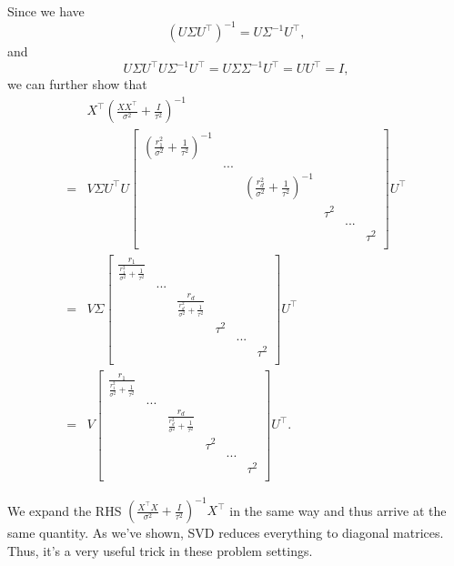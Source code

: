 Since we have 
\begin{equation*} \label{eu_eqn}
	(U \Sigma U^\top)^{-1} = U \Sigma^{-1} U^\top,
\end{equation*}
and
\begin{equation} \label{eu_eqn}
	U \Sigma U^\top U \Sigma^{-1} U^\top = U \Sigma \Sigma^{-1} U^\top = U U^\top = I,
\end{equation}
we can further show that 
\begin{align*}
		& X^\top (\frac{XX^\top}{\sigma^2} + \frac{I}{\tau^2})^{-1} \\
		= & V \Sigma U^\top U
		\begin{bmatrix}
			(\frac{r_1^2}{\sigma^2} + \frac{1}{\tau^2})^{-1} & & & & &  \\
			& ... & & & & \\
			& & (\frac{r_d^2}{\sigma^2} + \frac{1}{\tau^2})^{-1} & & &  \\
			& & & \tau^2 & & \\
			& & & & ... & \\
			& & & & & \tau^2 \\
		\end{bmatrix}
		U^\top \\
		= & V \Sigma
		\begin{bmatrix}
			\frac{r_1}{\frac{r_1^2}{\sigma^2} + \frac{1}{\tau^2}} & & & & &  \\
			& ... & & & & \\
			& & \frac{r_d}{\frac{r_d^2}{\sigma^2} + \frac{1}{\tau^2}} & & &  \\
			& & & \tau^2 & & \\
			& & & & ... & \\
			& & & & & \tau^2 \\
		\end{bmatrix}
		U^\top \\
		= & V 
		\begin{bmatrix}
			\frac{r_1}{\frac{r_1^2}{\sigma^2} + \frac{1}{\tau^2}} & & & & &  \\
			& ... & & & & \\
			& & \frac{r_d}{\frac{r_d^2}{\sigma^2} + \frac{1}{\tau^2}} & & &  \\
			& & & \tau^2 & & \\
			& & & & ... & \\
			& & & & & \tau^2 \\
		\end{bmatrix}
		U^\top.
\end{align*}

We expand the RHS $(\frac{X^\top X}{\sigma^2} + \frac{I}{\tau^2})^{-1} X^\top$ in the same way and thus arrive at the same quantity. As we've shown, SVD reduces everything to diagonal matrices. Thus, it's a very useful trick in these problem settings. 

